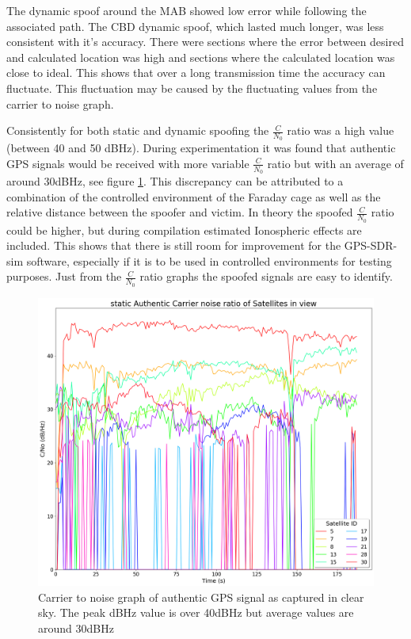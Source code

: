 The dynamic spoof around the MAB showed low error while following the associated path. The CBD dynamic spoof, which lasted much longer, was less consistent with it's
accuracy. There were sections where the error between desired and calculated location was high and sections where the calculated location was close to ideal. This shows that over a long
transmission time the accuracy can fluctuate. This fluctuation may be caused by the fluctuating values from the carrier to noise graph.

Consistently for both static and dynamic spoofing the $\frac{C}{N_0}$ ratio was a high value (between 40 and 50 dBHz). During experimentation it was found that authentic
GPS signals would be received with more variable $\frac{C}{N_0}$ ratio but with an average of around 30dBHz, see figure \ref{fig:authenticCNo}. This discrepancy can be attributed to a combination of the
controlled environment of the Faraday cage as well as the relative distance between the spoofer and victim. In theory the spoofed $\frac{C}{N_0}$ ratio could be higher,
but during compilation estimated Ionospheric effects are included. This shows that there is still room for improvement for the GPS-SDR-sim software, especially if it is
to be used in controlled environments for testing purposes. Just from the $\frac{C}{N_0}$ ratio graphs the spoofed signals are easy to identify.

\begin{figure}[!h]
    \begin{centering}
        \includegraphics[width=14cm,keepaspectratio]{Figures/gnss_log_2021_04_04_21_47_09_static_Authentic Carrier noise ratio.png}
        \caption{Carrier to noise graph of authentic GPS signal as captured in clear sky. The peak dBHz value is over 40dBHz but average values are around 30dBHz}
        \label{fig:authenticCNo}
    \end{centering}
\end{figure}

